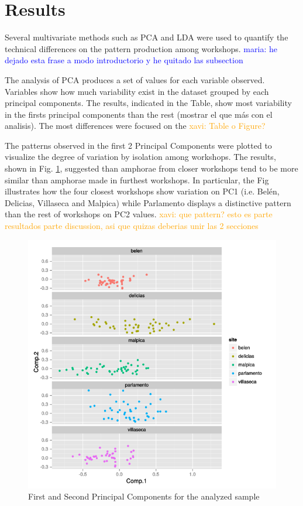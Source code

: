 \documentclass[review]{elsarticle}
\newcommand{\memo}[2]{\textcolor{#1}{#2}}
\newcommand{\xavi}[1]{\memo{orange}{xavi: #1\\}}
\newcommand{\maria}[1]{\memo{blue}{maria: #1\\}}
\begin{document}
\section{Results}

Several multivariate methods such as PCA and LDA were used to quantify the technical differences on the pattern production among workshops. 
\maria{he dejado esta frase a modo introductorio y he quitado las subsection} 

The analysis of PCA produces a set of values for each variable observed. Variables show how much variability exist in the dataset grouped by each principal components. The results, indicated in the Table, show most variability in the firsts principal components than the rest (mostrar el que más con el analisis).
The most differences were focused on the %
\xavi{Table o Figure?}

    

The patterns observed in the first 2 Principal Components were plotted to visualize the degree of variation by isolation among workshops. The results, shown in Fig. \ref{pca}, suggested than amphorae from closer workshops tend to be more similar than amphorae made in furthest workshops. In particular, the Fig illustrates how the four closest workshops show variation on PC1 (i.e. Bel\'en, Delicias, Villaseca and Malpica) while Parlamento displays a distinctive pattern than the rest of workshops on PC2 values. 
\xavi{que pattern? esto es parte resultados parte discussion, asi que quizas deberias unir las 2 secciones}


\begin{figure}[htp]
	\centering
\includegraphics[scale=0.40]{pca.png}
\caption{First and Second Principal Components for the analyzed sample}
\label{pca}
\end{figure} 
\end{document}
